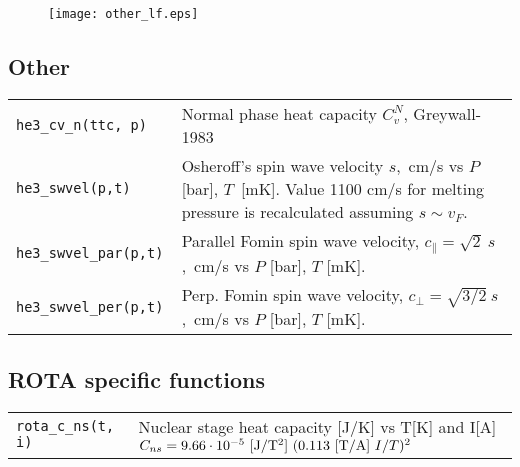 \documentclass[a4paper]{article}
\begin{document}
\begin{figure}[h]
\texttt{[image: other\_lf.eps]}\\
\end{figure}

\eject

\subsection*{Other}

\medskip
\noindent\begin{tabular}{lp{11cm}}
\tt he3\_cv\_n(ttc, p)       &Normal phase heat capacity $C_v^N$, {\small Greywall-1983}\\

\tt he3\_swvel(p,t) & Osheroff's spin wave velocity $s$,~cm/s
                      vs $P$ [bar], $T$~[mK]. Value 1100 cm/s for
                      melting pressure is recalculated assuming $s\sim v_F$.\\
\tt he3\_swvel\_par(p,t) & Parallel Fomin spin wave velocity,\newline
                          $c_\parallel = \sqrt{2}\ s$,~cm/s vs $P$ [bar], $T$ [mK].\\
\tt he3\_swvel\_per(p,t) & Perp. Fomin spin wave velocity,\newline
                          $c_\perp = \sqrt{3/2}\ s$,~cm/s vs $P$ [bar], $T$ [mK].\\

\end{tabular}
\medskip

\subsection*{ROTA specific functions}

\medskip
\noindent\begin{tabular}{lp{11cm}}
\tt rota\_c\_ns(t, i) &Nuclear stage heat capacity [J/K] vs T[K] and I[A]\newline
   $C_{ns} = 9.66 \cdot 10^{-5}\ {\rm [J/T^2]} \ (0.113\ {\rm [T/A]}\  I/T)^2$\\

\end{tabular}
\medskip


\end{document}

